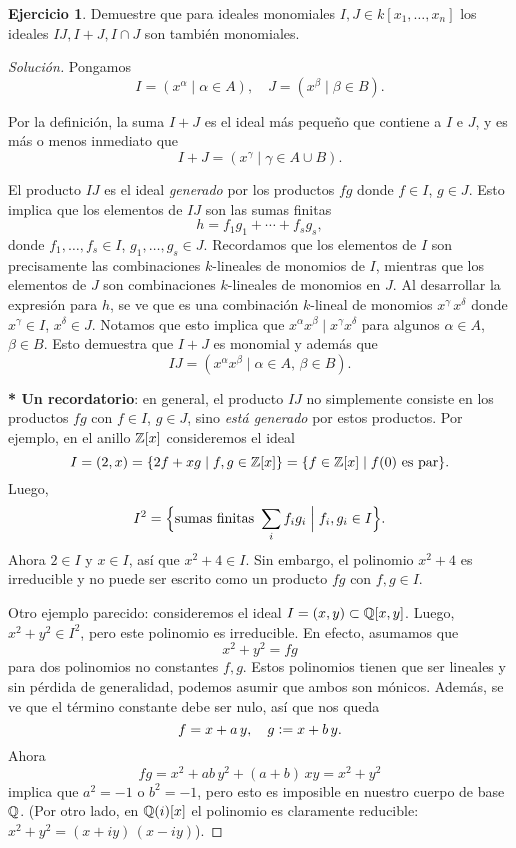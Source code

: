 \documentclass{article}
\theoremstyle{definition}
\newtheorem{ejerc}{Ejercicio}
\newenvironment{solucion}{\begin{proof}[Solución]}{\end{proof}}
\begin{document}
\begin{ejerc}
  Demuestre que para ideales monomiales $I,J \in k [x_1,\ldots,x_n]$ los ideales
  $IJ, I+J, I\cap J$ son también monomiales.

  \ifdefined\solutions\begin{solucion}
    Pongamos
    $$I = (x^\alpha \mid \alpha \in A), \quad J = (x^\beta \mid \beta \in B).$$

    Por la definición, la suma $I+J$ es el ideal más pequeño que contiene a $I$
    e $J$, y es más o menos inmediato que
    $$I+J = (x^\gamma \mid \gamma \in A \cup B).$$

    El producto $IJ$ es el ideal \emph{generado} por los productos $fg$ donde
    $f\in I$, $g\in J$. Esto implica que los elementos de $IJ$ son las sumas
    finitas
    $$h = f_1 g_1 + \cdots + f_s g_s,$$
    donde $f_1,\ldots,f_s \in I$, $g_1,\ldots,g_s \in J$. Recordamos que los
    elementos de $I$ son precisamente las combinaciones $k$-lineales de monomios
    de $I$, mientras que los elementos de $J$ son combinaciones $k$-lineales de
    monomios en $J$. Al desarrollar la expresión para $h$, se ve que es una
    combinación $k$-lineal de monomios $x^\gamma\,x^\delta$ donde
    $x^\gamma \in I$, $x^\delta \in J$. Notamos que esto implica que
    $x^\alpha x^\beta \mid x^\gamma x^\delta$ para algunos $\alpha \in A$,
    $\beta \in B$. Esto demuestra que $I+J$ es monomial y además que
    $$IJ = (x^\alpha x^\beta \mid \alpha \in A, \, \beta \in B).$$

    \noindent\textbf{* Un recordatorio}: en general, el producto $IJ$ no
    simplemente consiste en los productos $fg$ con $f\in I$, $g\in J$, sino
    \emph{está generado} por estos productos. Por ejemplo, en el anillo
    $\mathbb{Z} [x]$ consideremos el ideal
    \[ I = (2,x) = \{ 2f + xg \mid f,g \in \mathbb{Z} [x] \} =
       \{ f \in \mathbb{Z} [x] \mid f (0)\text{ es par} \}. \]
     Luego,
     $$I^2 = \Bigl\{ \text{sumas finitas }\sum_i f_i g_i \Bigm| f_i, g_i \in I \Bigr\}.$$
     Ahora $2\in I$ y $x \in I$, así que $x^2 + 4 \in I$. Sin embargo, el
     polinomio $x^2+4$ es irreducible y no puede ser escrito como un producto
     $fg$ con $f,g\in I$.

     Otro ejemplo parecido: consideremos el ideal $I = (x,y) \subset \mathbb{Q}
     [x,y]$. Luego, $x^2 + y^2 \in I^2$, pero este polinomio es irreducible. En
     efecto, asumamos que
     $$x^2 + y^2 = fg$$
     para dos polinomios no constantes $f,g$. Estos polinomios tienen que ser
     lineales y sin pérdida de generalidad, podemos asumir que ambos son
     mónicos. Además, se ve que el término constante debe ser nulo, así que nos
     queda
     $$f = x + a\,y, \quad g \mathrel{\mathop:}= x + b\,y.$$
     Ahora
     $$fg = x^2 + a b \, y^2 + (a + b)\,xy = x^2 + y^2$$
     implica que $a^2 = -1$ o $b^2 = -1$, pero esto es imposible en nuestro
     cuerpo de base $\mathbb{Q}$. (Por otro lado, en $\mathbb{Q} (i) [x]$ el polinomio es
     claramente reducible: $x^2 + y^2 = (x+iy)\,(x-iy)$).


\end{solucion}
\end{ejerc}
\end{document}
